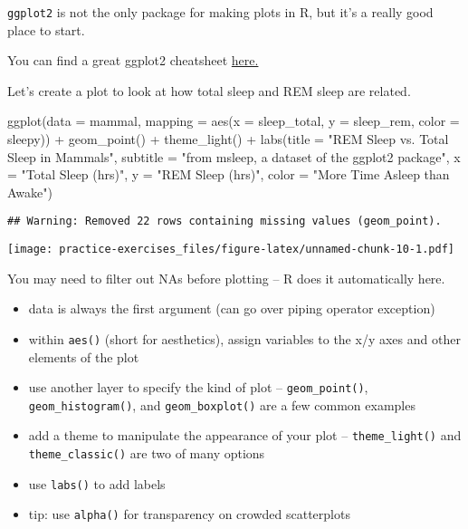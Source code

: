 \documentclass[]{article}
\newenvironment{Shaded}{\begin{snugshade}}{\end{snugshade}}
\newcommand{\AttributeTok}[1]{\textcolor[rgb]{0.77,0.63,0.00}{#1}}
\newcommand{\FunctionTok}[1]{\textcolor[rgb]{0.00,0.00,0.00}{#1}}
\newcommand{\NormalTok}[1]{#1}
\newcommand{\SpecialCharTok}[1]{\textcolor[rgb]{0.00,0.00,0.00}{#1}}
\newcommand{\StringTok}[1]{\textcolor[rgb]{0.31,0.60,0.02}{#1}}
\providecommand{\tightlist}{%
  \setlength{\itemsep}{0pt}\setlength{\parskip}{0pt}}
\begin{document}
\texttt{ggplot2} is not the only package for making plots in R, but it's
a really good place to start.

You can find a great ggplot2 cheatsheet
\href{https://rstudio.com/wp-content/uploads/2016/11/ggplot2-cheatsheet-2.1.pdf}{here.}

Let's create a plot to look at how total sleep and REM sleep are
related.

\begin{Shaded}
\begin{Highlighting}[]
\FunctionTok{ggplot}\NormalTok{(}\AttributeTok{data =}\NormalTok{ mammal, }\AttributeTok{mapping =} \FunctionTok{aes}\NormalTok{(}\AttributeTok{x =}\NormalTok{ sleep\_total, }\AttributeTok{y =}\NormalTok{ sleep\_rem, }\AttributeTok{color =}\NormalTok{ sleepy)) }\SpecialCharTok{+}
  \FunctionTok{geom\_point}\NormalTok{() }\SpecialCharTok{+}
  \FunctionTok{theme\_light}\NormalTok{() }\SpecialCharTok{+}
  \FunctionTok{labs}\NormalTok{(}\AttributeTok{title =} \StringTok{"REM Sleep vs. Total Sleep in Mammals"}\NormalTok{,}
       \AttributeTok{subtitle =} \StringTok{"from msleep, a dataset of the ggplot2 package"}\NormalTok{,}
       \AttributeTok{x =} \StringTok{"Total Sleep (hrs)"}\NormalTok{,}
       \AttributeTok{y =} \StringTok{"REM Sleep (hrs)"}\NormalTok{, }
       \AttributeTok{color =} \StringTok{"More Time Asleep than Awake"}\NormalTok{)}
\end{Highlighting}
\end{Shaded}

\begin{verbatim}
## Warning: Removed 22 rows containing missing values (geom_point).
\end{verbatim}

\texttt{[image: practice-exercises\_files/figure-latex/unnamed-chunk-10-1.pdf]}

You may need to filter out NAs before plotting -- R does it
automatically here.

\begin{itemize}
\tightlist
\item
  data is always the first argument (can go over piping operator
  exception)
\item
  within \texttt{aes()} (short for aesthetics), assign variables to the
  x/y axes and other elements of the plot
\item
  use another layer to specify the kind of plot --
  \texttt{geom\_point()}, \texttt{geom\_histogram()}, and
  \texttt{geom\_boxplot()} are a few common examples
\item
  add a theme to manipulate the appearance of your plot --
  \texttt{theme\_light()} and \texttt{theme\_classic()} are two of many
  options
\item
  use \texttt{labs()} to add labels
\item
  tip: use \texttt{alpha()} for transparency on crowded scatterplots
\end{itemize}
\end{document}
